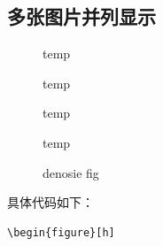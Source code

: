\documentclass[11pt,oneside]{book}
\begin{document}
\begin{common-format}
\section{多张图片并列显示}
\label{sec:多张图片并列显示}

\begin{figure}[H]
\label{fig:四栏图片}
\begin{multicols}{4}
\begin{linefig}{temp}
\end{linefig}
\begin{linefig}{temp}
\end{linefig}
\begin{linefig}{temp}
\end{linefig}
\begin{linefig}{temp}
\end{linefig}
\end{multicols}
\caption{denosie fig}
\label{fig:denosie fig}
\end{figure}

具体代码如下：
\begin{Verbatim}
\begin{figure}[h]


\end{Verbatim}
\end{common-format}
\end{document}
